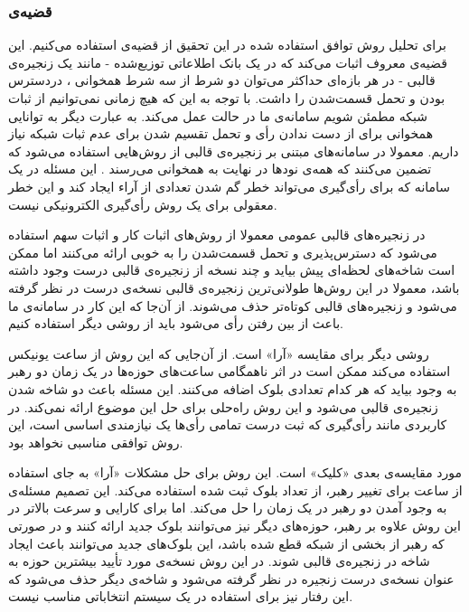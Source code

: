 \subsubsection{قضیه‌ی }
برای تحلیل روش توافق استفاده شده در این تحقیق از قضیه‌ی  استفاده می‌کنیم. این قضیه‌ی معروف 
\cite{CAP}
اثبات می‌کند که در یک بانک اطلاعاتی
 توزیع‌شده - مانند یک زنجیره‌ی قالبی - در هر بازه‌ای حداکثر می‌توان دو شرط از سه شرط همخوانی 
، دردسترس بودن 
و تحمل قسمت‌شدن
را داشت. با توجه به این که هیچ زمانی نمی‌توانیم از ثبات شبکه مطمئن شویم سامانه‌ی‌ ما در حالت  عمل می‌کند. به عبارت دیگر به توانایی همخوانی برای از دست ندادن رأی و تحمل تقسیم‌ شدن برای عدم ثبات شبکه نیاز داریم. معمولا در سامانه‌های مبتنی بر زنجیره‌ی قالبی از روش‌هایی استفاده می‌شود که تضمین می‌کنند که همه‌ی نودها در نهایت به همخوانی می‌رسند
.
این مسئله در یک سامانه که برای رأی‌گیری می‌تواند خطر گم شدن تعدادی از آراء ایجاد کند و این خطر معقولی برای یک‌ روش‌ رأی‌گیری الکترونیکی نیست.
\par
در زنجیره‌ها‌ی قالبی‌ عمومی معمولا از روش‌های اثبات کار و اثبات‌ سهم استفاده می‌شود که دسترس‌پذیری و تحمل قسمت‌شدن را به خوبی ارائه می‌کنند اما ممکن است شاخه‌های
لحظه‌ای پیش بیاید و چند نسخه از زنجیره‌ی قالبی درست وجود داشته باشد، معمولا در این روش‌ها طولانی‌ترین زنجیره‌ی قالبی نسخه‌ی درست در نظر گرفته می‌شود و زنجیره‌های قالبی‌ کوتاه‌تر حذف می‌شوند. از آن‌جا که این کار در سامانه‌ی ما باعث از بین رفتن رأی‌ می‌شود باید از روشی دیگر استفاده کنیم.
\par
روشی دیگر  برای مقایسه «آرا»
\cite{Aura}
است. از آن‌جایی که این روش از ساعت یونیکس
 استفاده می‌کند ممکن است در اثر ناهمگامی ساعت‌های حوزه‌ها در یک زمان دو رهبر به وجود بیاید که هر کدام تعدادی بلوک اضافه می‌کنند. این مسئله باعث دو شاخه شدن زنجیره‌ی قالبی می‌شود و این روش راه‌حلی برای حل این موضوع ارائه نمی‌کند. در کاربردی مانند رأی‌گیری که ثبت درست تمامی رأی‌ها یک نیازمندی اساسی است، این روش توافقی مناسبی نخواهد بود.
\par
مورد مقایسه‌ی بعدی «کلیک»
\cite{Clique}
است. این روش برای حل مشکلات «آرا» به جای استفاده از ساعت برای تغییر رهبر، از تعداد بلوک ثبت شده استفاده می‌کند. این تصمیم مسئله‌ی به وجود آمدن دو رهبر در یک زمان را حل می‌کند. اما برای کارایی و سرعت بالاتر در این روش علاوه بر رهبر، حوزه‌های دیگر نیز می‌توانند بلوک جدید ارائه کنند و در صورتی که رهبر از بخشی از شبکه قطع شده باشد، این بلوک‌های جدید می‌توانند باعث ایجاد شاخه در زنجیره‌ی قالبی شوند. در این روش نسخه‌ی مورد تأیید بیشترین حوزه به عنوان نسخه‌ی درست زنجیره در نظر گرفته می‌شود و شاخه‌ی دیگر حذف می‌شود که این رفتار نیز برای استفاده در یک سیستم انتخاباتی مناسب نیست. 
\par

